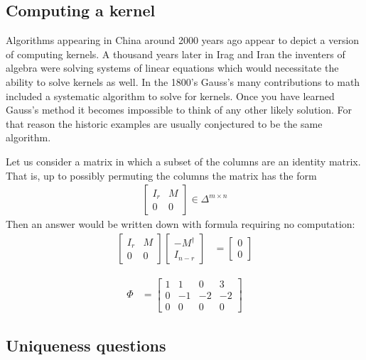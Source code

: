\documentclass[12pt,twoside,dvipsnames,letterpaper]{memoir}
\begin{document}
\subsection{Computing a kernel}
Algorithms appearing in China around 2000 years
ago appear to depict a version of computing kernels.
A thousand years later in Irag and Iran the inventers of 
algebra were solving systems of linear equations which 
would necessitate the ability to solve kernels as well.
In the 1800's Gauss's many contributions to math included 
a systematic algorithm to solve for kernels.  Once you 
have learned Gauss's method it becomes impossible to think 
of any other likely solution.  For that reason the historic 
examples are usually conjectured to be the same algorithm.

Let us consider a matrix in which a subset of the columns 
are an identity matrix.  That is, up to possibly permuting 
the columns the matrix has the form
\begin{align*}
    \begin{bmatrix}
        I_r & M \\ 
        0 & 0 
    \end{bmatrix}\in \Delta^{m\times n}
\end{align*}
Then an answer would be written down with formula 
requiring no computation:
\begin{align*}
    \begin{bmatrix}
        I_r & M \\ 
        0 & 0 
    \end{bmatrix}
    \begin{bmatrix}
        -M^{\dagger}  \\ 
        I_{n-r} 
    \end{bmatrix}
    & = 
    \begin{bmatrix}
        0\\
        0
    \end{bmatrix}
\end{align*}


\begin{align*}
    \Phi & = 
    \begin{bmatrix}
        1 & 1 & 0 & 3\\
        0 & -1 & -2 & -2\\
        0 & 0 & 0 & 0
    \end{bmatrix}
\end{align*}



\subsection{Uniqueness questions}
\end{document}
